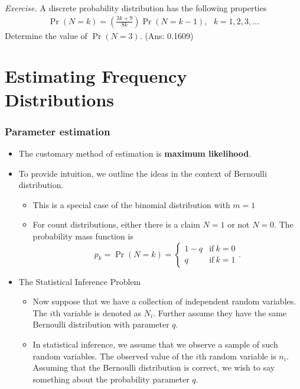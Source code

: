 \documentclass[]{book}
\theoremstyle{definition}
\theoremstyle{definition}
\theoremstyle{definition}
\theoremstyle{remark}
\begin{document}
\emph{Exercise.} A discrete probability distribution has the following
properties \[\begin{aligned}
\Pr(N=k) = \left( \frac{3k+9}{8k}\right) \Pr(N=k-1), ~~~k=1,2,3,\ldots\end{aligned}\]
Determine the value of \(\Pr(N=3)\). (Ans: 0.1609)

\section{Estimating Frequency
Distributions}\label{estimating-frequency-distributions}

\subsubsection{Parameter estimation}\label{parameter-estimation}

\begin{itemize}
\item
  The customary method of estimation is \textbf{maximum likelihood}.
\item
  To provide intuition, we outline the ideas in the context of Bernoulli
  distribution.

  \begin{itemize}
  \item
    This is a special case of the binomial distribution with \(m=1\)
  \item
    For count distributions, either there is a claim \(N=1\) or not
    \(N=0\). The probability mass function is
    \[p_k = \Pr (N=k) = \left\{ \begin{array}{ll}
    1-q & \mathrm{if}\ k=0 \\
    q& \mathrm{if}\ k=1
    \end{array} \right. .\]
  \end{itemize}
\item
  The Statistical Inference Problem

  \begin{itemize}
  \item
    Now suppose that we have a collection of independent random
    variables. The \(i\)th variable is denoted as \(N_i\). Further
    assume they have the same Bernoulli distribution with parameter
    \(q\).
  \item
    In statistical inference, we assume that we observe a sample of such
    random variables. The observed value of the \(i\)th random variable
    is \(n_i\). Assuming that the Bernoulli distribution is correct, we
    wish to say something about the probability parameter \(q\).
  \end{itemize}
\end{itemize}
\end{document}
